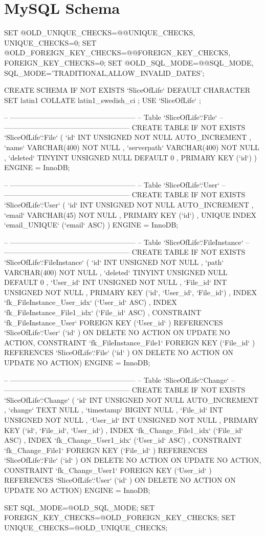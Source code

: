 \section{MySQL Schema}
\begin{spverbatim}
SET @OLD_UNIQUE_CHECKS=@@UNIQUE_CHECKS, UNIQUE_CHECKS=0;
SET @OLD_FOREIGN_KEY_CHECKS=@@FOREIGN_KEY_CHECKS, FOREIGN_KEY_CHECKS=0;
SET @OLD_SQL_MODE=@@SQL_MODE, SQL_MODE='TRADITIONAL,ALLOW_INVALID_DATES';

CREATE SCHEMA IF NOT EXISTS `SliceOfLife` DEFAULT CHARACTER SET latin1 COLLATE latin1_swedish_ci ;
USE `SliceOfLife` ;

-- -----------------------------------------------------
-- Table `SliceOfLife`.`File`
-- -----------------------------------------------------
CREATE  TABLE IF NOT EXISTS `SliceOfLife`.`File` (
  `id` INT UNSIGNED NOT NULL AUTO_INCREMENT ,
  `name` VARCHAR(400) NOT NULL ,
  `serverpath` VARCHAR(400) NOT NULL ,
  `deleted` TINYINT UNSIGNED NULL DEFAULT 0 ,
  PRIMARY KEY (`id`) )
ENGINE = InnoDB;


-- -----------------------------------------------------
-- Table `SliceOfLife`.`User`
-- -----------------------------------------------------
CREATE  TABLE IF NOT EXISTS `SliceOfLife`.`User` (
  `id` INT UNSIGNED NOT NULL AUTO_INCREMENT ,
  `email` VARCHAR(45) NOT NULL ,
  PRIMARY KEY (`id`) ,
  UNIQUE INDEX `email_UNIQUE` (`email` ASC) )
ENGINE = InnoDB;


-- -----------------------------------------------------
-- Table `SliceOfLife`.`FileInstance`
-- -----------------------------------------------------
CREATE  TABLE IF NOT EXISTS `SliceOfLife`.`FileInstance` (
  `id` INT UNSIGNED NOT NULL ,
  `path` VARCHAR(400) NOT NULL ,
  `deleted` TINYINT UNSIGNED NULL DEFAULT 0 ,
  `User_id` INT UNSIGNED NOT NULL ,
  `File_id` INT UNSIGNED NOT NULL ,
  PRIMARY KEY (`id`, `User_id`, `File_id`) ,
  INDEX `fk_FileInstance_User_idx` (`User_id` ASC) ,
  INDEX `fk_FileInstance_File1_idx` (`File_id` ASC) ,
  CONSTRAINT `fk_FileInstance_User`
    FOREIGN KEY (`User_id` )
    REFERENCES `SliceOfLife`.`User` (`id` )
    ON DELETE NO ACTION
    ON UPDATE NO ACTION,
  CONSTRAINT `fk_FileInstance_File1`
    FOREIGN KEY (`File_id` )
    REFERENCES `SliceOfLife`.`File` (`id` )
    ON DELETE NO ACTION
    ON UPDATE NO ACTION)
ENGINE = InnoDB;


-- -----------------------------------------------------
-- Table `SliceOfLife`.`Change`
-- -----------------------------------------------------
CREATE  TABLE IF NOT EXISTS `SliceOfLife`.`Change` (
  `id` INT UNSIGNED NOT NULL AUTO_INCREMENT ,
  `change` TEXT NULL ,
  `timestamp` BIGINT NULL ,
  `File_id` INT UNSIGNED NOT NULL ,
  `User_id` INT UNSIGNED NOT NULL ,
  PRIMARY KEY (`id`, `File_id`, `User_id`) ,
  INDEX `fk_Change_File1_idx` (`File_id` ASC) ,
  INDEX `fk_Change_User1_idx` (`User_id` ASC) ,
  CONSTRAINT `fk_Change_File1`
    FOREIGN KEY (`File_id` )
    REFERENCES `SliceOfLife`.`File` (`id` )
    ON DELETE NO ACTION
    ON UPDATE NO ACTION,
  CONSTRAINT `fk_Change_User1`
    FOREIGN KEY (`User_id` )
    REFERENCES `SliceOfLife`.`User` (`id` )
    ON DELETE NO ACTION
    ON UPDATE NO ACTION)
ENGINE = InnoDB;



SET SQL_MODE=@OLD_SQL_MODE;
SET FOREIGN_KEY_CHECKS=@OLD_FOREIGN_KEY_CHECKS;
SET UNIQUE_CHECKS=@OLD_UNIQUE_CHECKS;
\end{spverbatim}
\newpage
